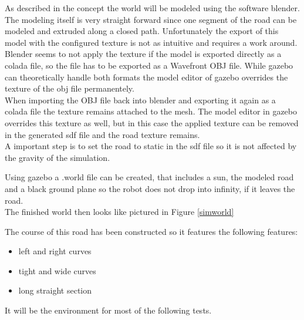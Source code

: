 As described in the concept the world will be modeled using the software blender.\\

The modeling itself is very straight forward since one segment of the road can be modeled and extruded along a closed path. Unfortunately the export of this model with the configured texture is not as intuitive and requires a work around.\\

Blender seems to not apply the texture if the model is exported directly as a colada file, so the file has to be exported as a Wavefront OBJ file. While gazebo can theoretically handle both formats the model editor of gazebo overrides the texture of the obj file permanentely.\\

When importing the OBJ file back into blender and exporting it again as a colada file the texture remains attached to the mesh. The model editor in gazebo overrides this texture as well, but in this case the applied texture can be removed in the generated sdf file and the road texture remains.\\

A important step is to set the road to static in the sdf file so it is not affected by the gravity of the simulation.

Using gazebo a .world file can be created, that includes a sun, the modeled road and a black ground plane so the robot does not drop into infinity, if it leaves the road.\\

The finished world then looks like pictured in Figure \ref{simworld}

The course of this road has been constructed so it features the following features:

\begin{itemize}
	\item left and right curves
	\item tight and wide curves
	\item long straight section
\end{itemize}

It will be the environment for most of the following tests.

